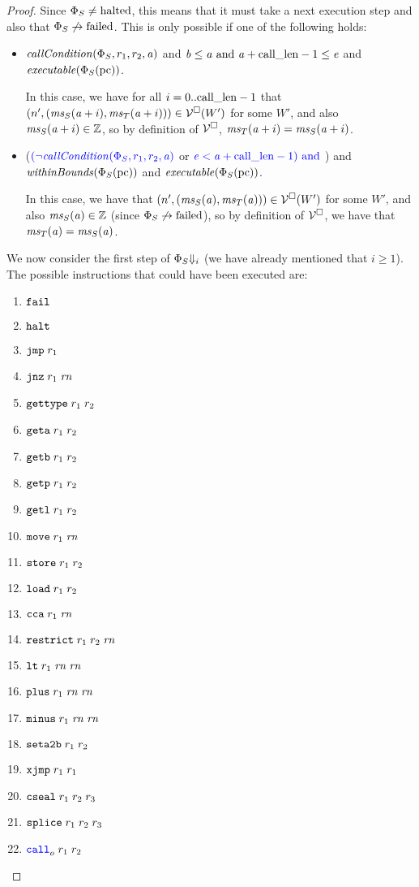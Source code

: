 \documentclass[a4paper]{article}
\begin{document}
\begin{proof}
Since $\Phi_S \neq \halted$, this means that it must take a next execution step and also that $\Phi_S \not\step\failed$. 
This is only possible if one of the following holds:
\begin{itemize}
\item $\callCond{\Phi_S,r_1,r_2,\aaddr}$ and
  $\baddr \leq \aaddr \tand \aaddr + \calllen-1 \leq \eaddr$ and 
  $\exec{\Phi_S(\pcreg)}$.

  In this case, we have for all $i = 0..\calllen-1$ that $\npair[n']{(\ms_S(\aaddr+i),\ms_T(\aaddr+i))} \in \lrv(W')$ for some $W'$, and also $\ms_S(\aaddr+i) \in \ints$, so by definition of $\lrv$, $\ms_T(\aaddr+i) = \ms_S(\aaddr+i)$.
\item ($\src{(\neg\callCond{\Phi_S,r_1,r_2,\aaddr}}$ or $\src{\eaddr < \aaddr + \calllen-1) \tand}$) and
  $\withinBounds{\Phi_S(\pcreg)}$ and $\exec{\Phi_S(\pcreg)}$.

  In this case, we have that $\npair[n']{(\ms_S(\aaddr),\ms_T(\aaddr))} \in \lrv(W')$ for some $W'$, and also $\ms_S(\aaddr) \in \ints$ (since $\Phi_S \not\step\failed$), so by definition of $\lrv$, we have that $\ms_T(\aaddr) = \ms_S(\aaddr)$.
\end{itemize}

We now consider the first step of $\Phi_S \term[i]$ (we have already mentioned that $i \geq 1$).
The possible instructions that could have been executed are:
\begin{enumerate}
\item $\tfail$
\item $\thalt$
\item $\tjmp{\trg{r_1}}$
\item $\tjnz{\trg{r_1}}{\trg{\rn}}$
\item $\tisptr{\trg{r_1}}{\trg{r_2}}$
\item $\tgeta{\trg{r_1}}{\trg{r_2}}$
\item $\tgetb{\trg{r_1}}{\trg{r_2}}$
\item $\tgetp{\trg{r_1}}{\trg{r_2}}$
\item $\tgetlin{\trg{r_1}}{\trg{r_2}}$
\item $\tmove{\trg{r_1}}{\trg{\rn}}$
\item $\tstore{\trg{r_1}}{\trg{r_2}}$
\item $\tload{\trg{r_1}}{\trg{r_2}}$
\item $\tcca{\trg{r_1}}{\trg{\rn}}$
\item $\trestrict{\trg{r_1}}{\trg{r_2}}{\trg{\rn}}$
\item $\tlt{\trg{r_1}}{\trg{\rn}}{\trg{\rn}}$
\item $\tplus{\trg{r_1}}{\trg{\rn}}{\trg{\rn}}$
\item $\tminus{\trg{r_1}}{\trg{\rn}}{\trg{\rn}}$
\item $\tsetatob{\trg{r_1}}{\trg{r_2}}$
\item $\txjmp{\trg{r_1}}{\trg{r_1}}$
\item $\tcseal{\trg{r_1}}{\trg{r_2}}{\trg{r_3}}$
\item $\tsplice{\trg{r_1}}{\trg{r_2}}{\trg{r_3}}$
\item $\scall[o]{}{r_1}{r_2}$
\end{enumerate}


\end{proof}
\end{document}
